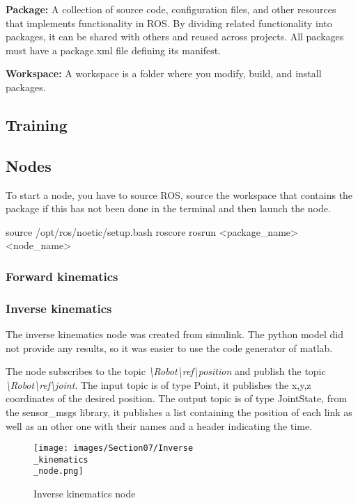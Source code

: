 \bigbreak
\textbf{Package:} A collection of source code, configuration files, and other resources that implements functionality in ROS. By dividing related functionality into packages, it can be shared with others and reused across projects. All packages must have a package.xml file defining its manifest.

\bigbreak
\textbf{Workspace:} A workspace is a folder where you modify, build, and install packages.

\subsection{Training}

\subsection{Nodes}
\hspace{\parindent} To start a node, you have to source ROS, source the workspace that contains the package if this has not been done in the terminal and then launch the node.
\begin{commandshell}
    source /opt/ros/noetic/setup.bash
    roscore
    rosrun <package_name> <node_name>
\end{commandshell}

\subsubsection{Forward kinematics}

\subsubsection{Inverse kinematics}

\hspace{\parindent} The inverse kinematics node was created from simulink. The python model did not provide any results, so it was easier to use the code generator of matlab.

\bigbreak
The node subscribes to the topic \textit{\textbackslash Robot\textbackslash ref\textbackslash position} and publish the topic \textit{\textbackslash Robot\textbackslash ref\textbackslash joint}. The input topic is of type Point, it publishes the x,y,z coordinates of the desired position. The output topic is of type JointState, from the sensor\_msgs library, it publishes a list containing the position of each link as well as an other one with their names and a header indicating the time.
\bigbreak
\begin{figure}[ht]
    \centering
    \texttt{[image: images/Section07/Inverse\\\_kinematics\\\_node.png]}
    \caption{Inverse kinematics node}
    \label{fig:mesh21}
\end{figure}
\FloatBarrier

